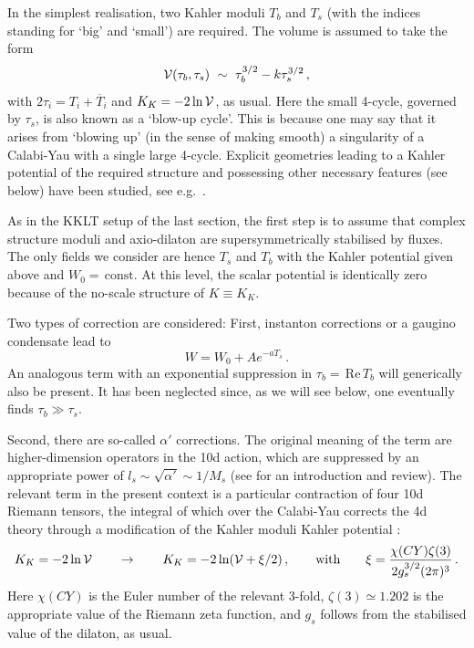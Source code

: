 \documentclass[12pt]{article}
\newcommand{\be}{\begin{equation}}
\newcommand{\ee}{\end{equation}}
\newcommand{\ol}{\overline}
\numberwithin{equation}{section}
\begin{document}
In the simplest realisation, two Kahler moduli $T_b$ and $T_s$ (with the indices standing for `big' and `small') are required. The volume is assumed to take the form
\be
{\cal V}(\tau_b,\tau_s)\,\,\sim\,\, \tau_b^{3/2}-k \tau_s^{3/2}\,,
\ee
with $2\tau_i=T_i+\ol{T}_i$ and $K_K=-2\ln{\cal V}$, as usual. Here the small 4-cycle, governed by $\tau_s$, is also known as a `blow-up cycle'. This is because one may say that it arises from `blowing up' (in the sense of making smooth) a singularity of a Calabi-Yau with a single large 4-cycle. Explicit geometries leading to a Kahler potential of the required structure and possessing other necessary features (see below) have been studied, see e.g.~\cite{Cicoli:2012vw, Cicoli:2013cha}.

As in the KKLT setup of the last section, the first step is to assume that complex structure moduli and axio-dilaton are supersymmetrically stabilised by fluxes. The only fields we consider are hence $T_s$ and $T_b$ with the Kahler potential given above and $W_0=\,\mbox{const.}$ At this level, the scalar potential is identically zero because of the no-scale structure of $K\equiv K_K$.

Two types of correction are considered: First, instanton corrections or a gaugino condensate lead to
\be
W=W_0+A e^{-a T_s}\,.\label{wlvs}
\ee
An analogous term with an exponential suppression in $\tau_b =\,$Re$ \,T_b$ will generically also be present. It has been neglected since, as we will see below, one eventually finds $\tau_b\gg \tau_s$.

Second, there are so-called $\alpha'$ corrections. The original meaning of the term are higher-dimension operators in the 10d action, which are suppressed by an appropriate power of $l_s\sim \sqrt{\alpha'}\sim 1/M_s$ (see \cite{Green:1999qt} for an introduction and review).
The relevant term in the present context is a particular contraction of four 10d Riemann tensors, the integral of which over the Calabi-Yau corrects the 4d theory through a modification of the Kahler moduli Kahler potential \cite{Becker:2002nn}:
\be
K_K=-2\ln{\cal V}\qquad\to\qquad K_K=-2\ln({\cal V}+\xi/2)\,,\qquad\mbox{with}\qquad 
\xi=\frac{\chi(CY)\zeta(3)}{2g_s^{3/2}(2\pi)^3}\,.\label{klvs}
\ee
Here $\chi(CY)$ is the Euler number of the relevant 3-fold, $\zeta(3)\simeq 1.202$ is the appropriate value of the Riemann zeta function, and $g_s$ follows from the stabilised value of the dilaton, as usual.
\end{document}
